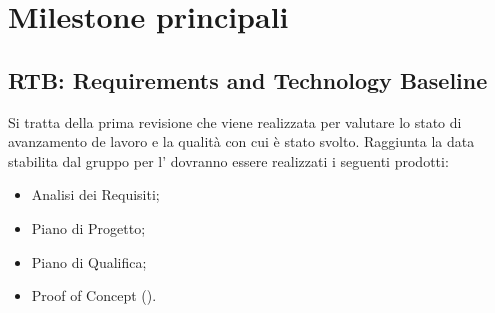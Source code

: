 \section{Milestone principali}
\label{sec:milestone_principali}
\subsection{RTB: Requirements and Technology Baseline}
Si tratta della prima revisione che viene realizzata per valutare lo stato di avanzamento de lavoro e la qualità con cui è stato svolto.
Raggiunta la data stabilita dal gruppo per l' dovranno essere realizzati i seguenti prodotti:

\begin{itemize}
\item Analisi dei Requisiti;
\item Piano di Progetto;
\item Piano di Qualifica;
\item Proof of Concept ().
\end{itemize}


